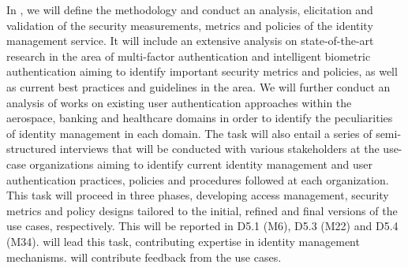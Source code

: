 \begin{Workpackage}{\thewpno}
\begin{WPDescription}
\end{WPDescription}

\begin{Task}
\TaskResults{%
\ref{del:auth1},
\ref{del:auth3},
\ref{del:auth4}
}
\TaskHeader{}

In \theTask, we will define the methodology and conduct an analysis, elicitation and validation of the security measurements, metrics and policies of the identity management service. It will include an extensive analysis on state-of-the-art research in the area of multi-factor authentication and intelligent biometric authentication aiming to identify important security metrics and policies, as well as current best practices and guidelines in the area. We will further conduct an analysis of works on existing user authentication approaches within the aerospace, banking and healthcare domains in order to identify the peculiarities of identity management in each domain. The task will also entail a series of semi-structured interviews that will be conducted with various stakeholders at the use-case organizations aiming to identify current identity management and user authentication practices, policies and procedures followed at each organization. This task will proceed in three phases, developing access management, security metrics and policy designs tailored to the initial, refined and final versions of the use cases, respectively. This
will be reported in D5.1 (M6), D5.3 (M22) and D5.4 (M34). \COGNIshort{} will lead this task, contributing expertise in identity management mechanisms. \SOPRAshort{} will contribute feedback from the use cases. 
\end{Task}

\begin{Task}
\TaskResults{%
\ref{del:auth2},
\ref{del:auth3},
\ref{del:auth4}
}
\TaskHeader{}


\end{Task}
\end{Workpackage}
